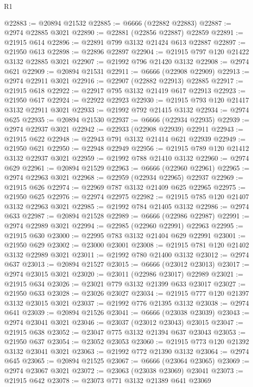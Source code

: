 \begin{lexlean}{R1}
\begin{coremodule}
@22883 := @20894 @21532
@22885 := @6666 (@22882 @22883)
@22887 := @2974 @22885 @3021
@22890 := @22881 (@22856 @22887) @22859
@22891 := @21915 @614
@22896 := @22891 @799 @3132 @21424 @613 @22887
@22897 := @21950 @613
@22898 := @22896 @22897
@22904 := @21915 @797 @120 @21422 @3132 @22885 @3021
@22907 := @21992 @796 @21420 @3132
@22908 := @2974 @621
@22909 := @20894 @21531
@22911 := @6666 (@22908 @22909)
@22913 := @2974 @22911 @3021
@22916 := @22907 (@22882 @22913) @22885
@22917 := @21915 @618
@22922 := @22917 @795 @3132 @21419 @617 @22913
@22923 := @21950 @617
@22924 := @22922 @22923
@22930 := @21915 @793 @120 @21417 @3132 @22911 @3021
@22933 := @21992 @792 @21415 @3132
@22934 := @2974 @625
@22935 := @20894 @21530
@22937 := @6666 (@22934 @22935)
@22939 := @2974 @22937 @3021
@22942 := @22933 (@22908 @22939) @22911
@22943 := @21915 @622
@22948 := @22943 @791 @3132 @21414 @621 @22939
@22949 := @21950 @621
@22950 := @22948 @22949
@22956 := @21915 @789 @120 @21412 @3132 @22937 @3021
@22959 := @21992 @788 @21410 @3132
@22960 := @2974 @629
@22961 := @20894 @21529
@22963 := @6666 (@22960 @22961)
@22965 := @2974 @22963 @3021
@22968 := @22959 (@22934 @22965) @22937
@22969 := @21915 @626
@22974 := @22969 @787 @3132 @21409 @625 @22965
@22975 := @21950 @625
@22976 := @22974 @22975
@22982 := @21915 @785 @120 @21407 @3132 @22963 @3021
@22985 := @21992 @784 @21405 @3132
@22986 := @2974 @633
@22987 := @20894 @21528
@22989 := @6666 (@22986 @22987)
@22991 := @2974 @22989 @3021
@22994 := @22985 (@22960 @22991) @22963
@22995 := @21915 @630
@23000 := @22995 @783 @3132 @21404 @629 @22991
@23001 := @21950 @629
@23002 := @23000 @23001
@23008 := @21915 @781 @120 @21402 @3132 @22989 @3021
@23011 := @21992 @780 @21400 @3132
@23012 := @2974 @637
@23013 := @20894 @21527
@23015 := @6666 (@23012 @23013)
@23017 := @2974 @23015 @3021
@23020 := @23011 (@22986 @23017) @22989
@23021 := @21915 @634
@23026 := @23021 @779 @3132 @21399 @633 @23017
@23027 := @21950 @633
@23028 := @23026 @23027
@23034 := @21915 @777 @120 @21397 @3132 @23015 @3021
@23037 := @21992 @776 @21395 @3132
@23038 := @2974 @641
@23039 := @20894 @21526
@23041 := @6666 (@23038 @23039)
@23043 := @2974 @23041 @3021
@23046 := @23037 (@23012 @23043) @23015
@23047 := @21915 @638
@23052 := @23047 @775 @3132 @21394 @637 @23043
@23053 := @21950 @637
@23054 := @23052 @23053
@23060 := @21915 @773 @120 @21392 @3132 @23041 @3021
@23063 := @21992 @772 @21390 @3132
@23064 := @2974 @645
@23065 := @20894 @21525
@23067 := @6666 (@23064 @23065)
@23069 := @2974 @23067 @3021
@23072 := @23063 (@23038 @23069) @23041
@23073 := @21915 @642
@23078 := @23073 @771 @3132 @21389 @641 @23069

\end{coremodule}
\end{lexlean}
